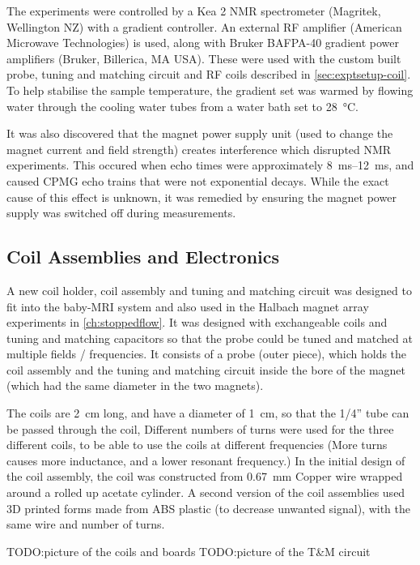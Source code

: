 The experiments were controlled by a Kea 2 NMR spectrometer (Magritek, Wellington NZ) with a gradient controller.
An external RF amplifier (American Microwave Technologies) is used, along with Bruker BAFPA-40 gradient power amplifiers (Bruker, Billerica, MA USA).
These were used with the custom built probe, tuning and matching circuit and RF coils described in \autoref{sec:exptsetup-coil}.
To help stabilise the sample temperature, the gradient set was warmed by flowing water through the cooling water tubes from a water bath set to \SI{28}{\celsius}.

It was also discovered that the magnet power supply unit (used to change the magnet current and field strength) creates interference which disrupted NMR experiments.
This occured when echo times were approximately \SIrange{8}{12}{ms}, and caused CPMG echo trains that were not exponential decays.
While the exact cause of this effect is unknown, it was remedied by ensuring the magnet power supply was switched off during measurements.

\subsection{Coil Assemblies and Electronics}
\label{sec:exptsetup-coil}
A new coil holder, coil assembly and tuning and matching circuit was designed to fit into the baby-MRI system and also used in the Halbach magnet array experiments in  \autoref{ch:stoppedflow}.
It was designed with exchangeable coils and tuning and matching capacitors so that the probe could be tuned and matched at multiple fields / frequencies.
It consists of a probe (outer piece), which holds the coil assembly and the tuning and matching circuit inside the bore of the magnet (which had the same diameter in the two magnets).

The coils are \SI{2}{cm} long, and have a diameter of \SI{1}{cm}, so that the 1/4'' tube can be passed through the coil,
Different numbers of turns were used for the three different coils, to be able to use the coils at different frequencies (More turns causes more inductance, and a lower resonant frequency.)
In the initial design of the coil assembly, the coil was constructed from \SI{0.67}{mm} Copper wire wrapped around a rolled up acetate cylinder.
A second version of the coil assemblies used 3D printed forms made from ABS plastic (to decrease unwanted signal), with the same wire and number of turns.

TODO:picture of the coils and boards
TODO:picture of the T\&M circuit

